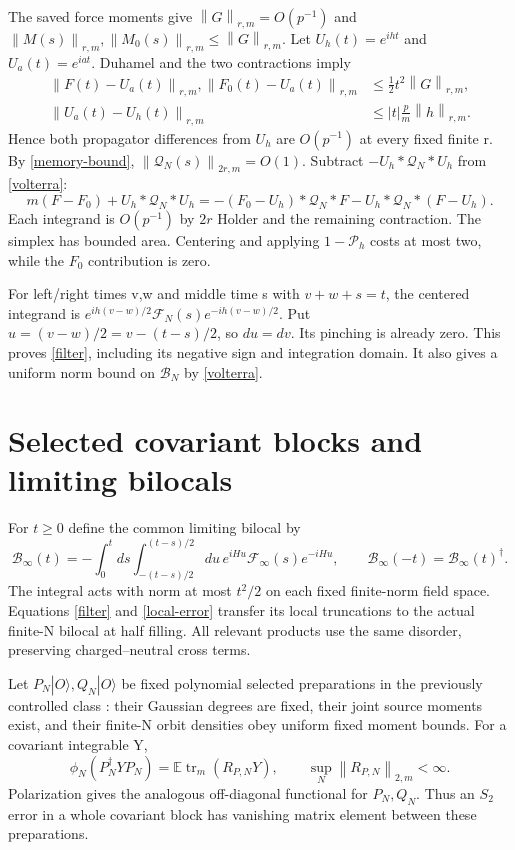 \documentclass[11pt]{article}
\newcommand{\E}{\mathbb E}
\newcommand{\tr}{\operatorname{tr}}
\newcommand{\Pin}{\mathcal P_h}
\newcommand{\norm}[1]{\left\lVert#1\right\rVert}
\begin{document}
The saved force moments \cite{return} give
$\norm G_{r,m}=O(p^{-1})$ and
$\norm{M(s)}_{r,m},\norm{M_0(s)}_{r,m}\le\norm G_{r,m}$.
Let $U_h(t)=e^{iht}$ and $U_a(t)=e^{iat}$. Duhamel and the
two contractions imply
\begin{align}
 \norm{F(t)-U_a(t)}_{r,m},\norm{F_0(t)-U_a(t)}_{r,m}
       &\le\tfrac12 t^2\norm G_{r,m},\nonumber\\
 \norm{U_a(t)-U_h(t)}_{r,m}&\le |t|\frac p m\norm h_{r,m}.
 \label{free-errors}
\end{align}
Hence both propagator differences from $U_h$ are $O(p^{-1})$
at every fixed finite r. By \eqref{memory-bound},
$\norm{\mathcal Q_N(s)}_{2r,m}=O(1)$.
Subtract $-U_h*\mathcal Q_N*U_h$ from \eqref{volterra}:
\[
 m(F-F_0)+U_h*\mathcal Q_N*U_h
 =-(F_0-U_h)*\mathcal Q_N*F
       -U_h*\mathcal Q_N*(F-U_h).
\]
Each integrand is $O(p^{-1})$ by $2r$ Holder and the remaining
contraction. The simplex has bounded area. Centering and applying
$1-\Pin$ costs at most two, while the $F_0$ contribution is zero.

For left/right times v,w and middle time s with $v+w+s=t$,
the centered integrand is
$e^{ih(v-w)/2}\mathcal F_N(s)e^{-ih(v-w)/2}$.
Put $u=(v-w)/2=v-(t-s)/2$, so $du=dv$.
Its pinching is already zero. This proves \eqref{filter},
including its negative sign and integration domain. It also
gives a uniform norm bound on $\mathcal B_N$ by \eqref{volterra}.

\newpage
\section{Selected covariant blocks and limiting bilocals}\label{selected}
For $t\ge0$ define the common limiting bilocal by
\begin{equation}\label{bilocal-limit}
 \mathcal B_\infty(t)=-\int_0^t ds
 \int_{-(t-s)/2}^{(t-s)/2}du\,
               e^{iHu}\mathcal F_\infty(s)e^{-iHu},
 \qquad\mathcal B_\infty(-t)=\mathcal B_\infty(t)^\dagger.
\end{equation}
The integral acts with norm at most $t^2/2$ on each fixed
finite-norm field space. Equations \eqref{filter} and
\eqref{local-error} transfer its local truncations to the actual
finite-N bilocal at half filling. All relevant products use
the same disorder, preserving charged--neutral cross terms.

Let $P_N|O\rangle,Q_N|O\rangle$ be fixed polynomial selected
preparations in the previously controlled class \cite{density,higher}:
their Gaussian degrees are fixed, their joint source moments
exist, and their finite-N orbit densities obey uniform fixed
moment bounds. For a covariant integrable Y,
\[
 \phi_N(P_N^\dagger YP_N)=\E\tr_m(R_{P,N}Y),\qquad
 \sup_N\norm{R_{P,N}}_{2,m}<\infty.
\]
Polarization gives the analogous off-diagonal functional for
$P_N,Q_N$. Thus an $S_2$ error in a whole covariant block
has vanishing matrix element between these preparations.
\end{document}
